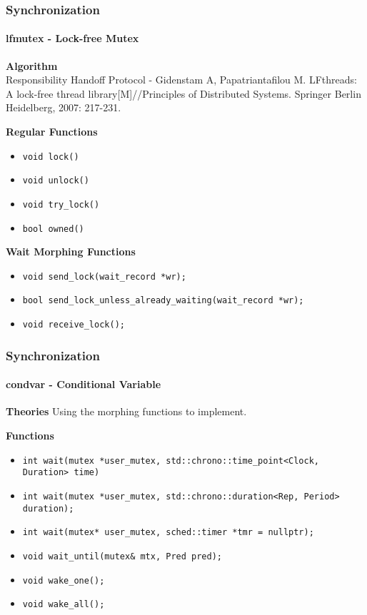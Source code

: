 \documentclass[10pt]{beamer}
\begin{document}
\begin{frame}
	\frametitle{Synchronization}
	\framesubtitle{lfmutex - Lock-free Mutex}
	
	\textbf{Algorithm} \\
	Responsibility Handoff Protocol - Gidenstam A, Papatriantafilou M. LFthreads: A lock-free thread library[M]//Principles of Distributed Systems. Springer Berlin Heidelberg, 2007: 217-231.

	\smallskip
	
	\textbf{Regular Functions}
	\begin{itemize}
		\item \texttt{void lock()}
		\item \texttt{void unlock()}
		\item \texttt{void try\_lock()}
		\item \texttt{bool owned()}
	\end{itemize}
	
	\smallskip
	
	\textbf{Wait Morphing Functions}
	\begin{itemize}
		\item \texttt{void send\_lock(wait\_record *wr);}
		\item \texttt{bool send\_lock\_unless\_already\_waiting(wait\_record *wr);}
		\item \texttt{void receive\_lock();}
	\end{itemize}
	
\end{frame}

\begin{frame}
	\frametitle{Synchronization}
	\framesubtitle{condvar - Conditional Variable}

	\textbf{Theories}
	Using the morphing functions to implement.
	
	\smallskip

	\textbf{Functions}
	\begin{itemize}
		\item \texttt{int wait(mutex *user\_mutex, std::chrono::time\_point<Clock, Duration> time)}
		\item \texttt{int wait(mutex *user\_mutex, std::chrono::duration<Rep, Period> duration);}
		\item \texttt{int wait(mutex* user\_mutex, sched::timer *tmr = nullptr);}
		\item \texttt{void wait\_until(mutex\& mtx, Pred pred);}
		\item \texttt{void wake\_one();}
		\item \texttt{void wake\_all();}
	\end{itemize}
	
\end{frame}
\end{document}
